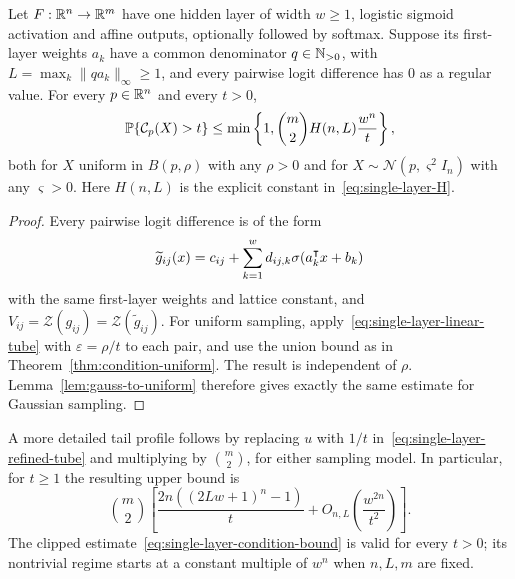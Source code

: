 \begin{corollary}\label{cor:nn-condition-single-layer}
Let $F:\mathbb{R}^n\to\mathbb{R}^m$ have one hidden layer of width $w\ge1$, logistic sigmoid activation and affine outputs, optionally followed by softmax. Suppose its first-layer weights $a_k$ have a common denominator $q\in\mathbb{N}_{>0}$, with $L=\max_k\|qa_k\|_\infty\ge1$, and every pairwise logit difference has $0$ as a regular value. For every $p\in\mathbb{R}^n$ and every $t>0$,
\begin{equation}\label{eq:single-layer-condition-bound}
\operatorname*{\mathbb{P}}\{\mathcal{C}_p(X)>t\}
\le\min\left\{1,\binom m2 H(n,L)\frac{w^n}{t}\right\},
\end{equation}
both for $X$ uniform in $B(p,\rho)$ with any $\rho>0$ and for $X\sim\mathcal N(p,\varsigma^2 I_n)$ with any $\varsigma>0$. Here $H(n,L)$ is the explicit constant in~\eqref{eq:single-layer-H}.
\end{corollary}

\begin{proof}
Every pairwise logit difference is of the form
\[
\widetilde g_{ij}(x)=c_{ij}+\sum_{k=1}^w d_{ij,k}\sigma(a_k^{\intercal}x+b_k)
\]
with the same first-layer weights and lattice constant, and $V_{ij}=\mathcal Z(g_{ij})=\mathcal Z(\widetilde g_{ij})$. For uniform sampling, apply~\eqref{eq:single-layer-linear-tube} with $\varepsilon=\rho/t$ to each pair, and use the union bound as in Theorem~\ref{thm:condition-uniform}. The result is independent of $\rho$. Lemma~\ref{lem:gauss-to-uniform} therefore gives exactly the same estimate for Gaussian sampling.
\end{proof}

\begin{remark}\label{rem:single-layer-condition-tight}
A more detailed tail profile follows by replacing $u$ with $1/t$ in~\eqref{eq:single-layer-refined-tube} and multiplying by $\binom m2$, for either sampling model. In particular, for $t\ge1$ the resulting upper bound is
\[
\binom m2\left[
\frac{2n((2Lw+1)^n-1)}{t}
+O_{n,L}\!\left(\frac{w^{2n}}{t^2}\right)\right].
\]
The clipped estimate~\eqref{eq:single-layer-condition-bound} is valid for every $t>0$; its nontrivial regime starts at a constant multiple of $w^n$ when $n,L,m$ are fixed.
\end{remark}
